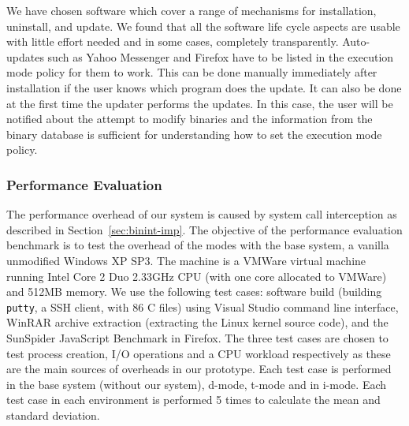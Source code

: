 We have chosen software which cover a range of mechanisms for installation,
uninstall, and update.
We found that all the software life cycle aspects are usable
with little effort needed and in some cases, completely transparently.
Auto-updates such as Yahoo Messenger and Firefox have to be listed in
the execution mode policy for them to work.
This can be done manually immediately after installation if the user knows
which program does the update.
It can also be done at the first time the updater performs the updates.
In this case, the user will be notified about the attempt to modify binaries
and the information from the binary database is sufficient for understanding
how to set the execution mode policy.

\subsubsection{Performance Evaluation}

The performance overhead of our system is caused by system call interception
as described in Section~\ref{sec:binint-imp}.
The objective of the performance evaluation benchmark is to test
the overhead of the modes with the base system,
a vanilla unmodified Windows XP SP3.
The machine is a VMWare virtual machine running Intel Core 2 Duo 2.33GHz
CPU (with one core allocated to VMWare) and 512MB memory.
We use the following test cases:
software build (building {\tt putty}, a SSH client, with 86 C files) using
Visual Studio command line interface,
WinRAR archive extraction (extracting the Linux kernel source code),
and the SunSpider JavaScript Benchmark in Firefox.
The three test cases are chosen to test process creation,
I/O operations and a CPU workload respectively as these are the
main sources of overheads in our prototype.
Each test case is performed in the base system (without our system),
d-mode, t-mode and in i-mode.
Each test case in each environment is performed 5 times to calculate the
mean and standard deviation.

